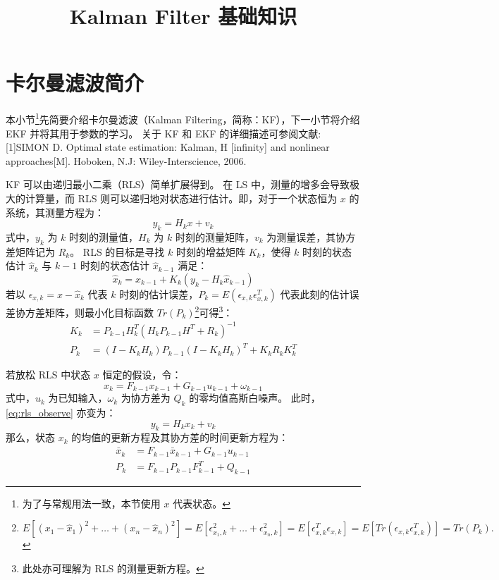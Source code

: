 \documentclass[UTF8]{ctexart}
\date{}
\title{Kalman Filter 基础知识}
\begin{document}
\maketitle

\section{卡尔曼滤波简介}
本小节\footnote{为了与常规用法一致，本节使用 $x$ 代表状态。}先简要介绍卡尔曼滤波（Kalman Filtering，简称：KF），下一小节将介绍 EKF 并将其用于参数的学习。
关于 KF 和 EKF 的详细描述可参阅文献:
[1]SIMON D. Optimal state estimation: Kalman, H [infinity] and nonlinear approaches[M]. Hoboken, N.J: Wiley-Interscience, 2006.


KF 可以由递归最小二乘（RLS）简单扩展得到。
在 LS 中，测量的增多会导致极大的计算量，而 RLS 则可以递归地对状态进行估计。即，对于一个状态恒为 $x$ 的系统，其测量方程为：
\begin{equation}
  \label{eq:rls_observe}
  y_k =H_kx + v_k
\end{equation}
式中，$y_k$ 为 $k$ 时刻的测量值，$H_k$ 为 $k$ 时刻的测量矩阵，$v_k$ 为测量误差，其协方差矩阵记为 $R_k$。
RLS 的目标是寻找 $k$ 时刻的增益矩阵 $K_k$，使得 $k$ 时刻的状态估计 $\hat{x}_k$ 与 $k-1$ 时刻的状态估计 $\hat{x}_{k-1}$ 满足：
\begin{equation}
  \label{eq:12}
  \hat{x}_k =\hat{x}_{k-1}+K_k(y_k-H_k\hat{x}_{k-1})
\end{equation}
若以 $\epsilon_{x,k}=x-\hat{x}_k$ 代表 $k$ 时刻的估计误差，$P_k=E(\epsilon_{x,k}\epsilon_{x,k}^T)$ 代表此刻的估计误差协方差矩阵，则最小化目标函数 $Tr(P_k)$\footnote{$E[(x_1-\hat{x}_1)^2+\ldots+(x_n-\hat{x}_n)^2]=E[\epsilon_{x_1,k}^2+\ldots+\epsilon_{x_n,k}^2]=E[\epsilon_{x,k}^T\epsilon_{x,k}]=E[Tr(\epsilon_{x,k}\epsilon_{x,k}^T)]=Tr(P_k).$}可得\footnote{此处亦可理解为 RLS 的测量更新方程。}：
\begin{align}
K_k&=P_{k-1}H^T_k(H_kP_{k-1}H^T+R_k)^{-1} \\
P_k&=(I-K_kH_k)P_{k-1}(I-K_kH_k)^T+K_kR_kK_k^T
\end{align}

若放松 RLS 中状态 $x$ 恒定的假设，令：
\begin{equation}
x_k=F_{k-1}x_{k-1}+G_{k-1}u_{k-1}+\omega_{k-1}
\end{equation}
式中，$u_k$ 为已知输入，$\omega_k$ 为协方差为 $Q_k$ 的零均值高斯白噪声。
此时，\eqref{eq:rls_observe} 亦变为：
\begin{equation}
  y_k =H_kx_k + v_k
\end{equation}
那么，状态 $x_k$ 的均值的更新方程及其协方差的时间更新方程为：
\begin{align}
  \label{eq:rls_relaxed_x}
  \bar{x}_k &=F_{k-1}\bar{x}_{k-1}+G_{k-1}u_{k-1}\\
  \label{eq:rls_relaxed_p}   
  P_{k}&=F_{k-1}P_{k-1}F_{k-1}^T+Q_{k-1}        
\end{align}
\end{document}
